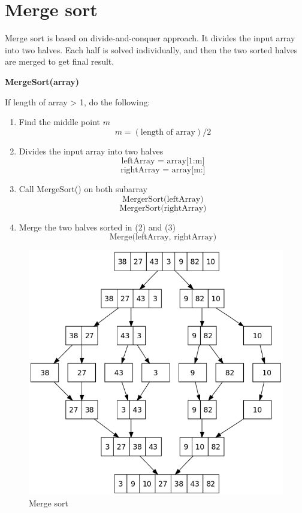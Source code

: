 \documentclass[a4paper,11pt]{book}
\begin{document}
\newpage

\section{Merge sort}

\noindent Merge sort is based on divide-and-conquer approach. It divides the input array into two halves. Each half is solved individually, and then the two sorted halves are merged to get final result.

\vspace{5mm}

\noindent \textbf{MergeSort(array)}
\vspace{3mm}

\noindent If length of array > 1, do the following:
\begin{enumerate}
    \item Find the middle point $m$ 
    $$m = (\text{length of array})/2$$
    \item Divides the input array into two halves
          $$\text{leftArray = array[1:m]}$$
          $$\text{rightArray = array[m:]}$$
    \item Call MergeSort() on both subarray
        $$\text{MergerSort(leftArray)}$$
        $$\text{MergerSort(rightArray)}$$
    \item Merge the two halves sorted in (2) and (3)
        $$ \text{Merge(leftArray, rightArray)}$$
\end{enumerate}

\begin{figure}[ht]
	\centering
	\includegraphics[scale=0.5]{code/sort/pic/mergesort.png}
	\caption{Merge sort}
\end{figure}
\end{document}
